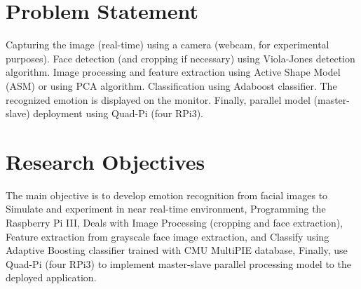 \section{Problem Statement}
Capturing the image (real-time) using a camera (webcam, for experimental purposes). Face detection (and cropping if necessary) using Viola-Jones detection algorithm. Image processing and feature extraction using Active Shape Model (ASM) or using PCA algorithm. Classification using Adaboost classifier. The recognized emotion is displayed on the monitor. Finally, parallel model (master-slave) deployment using Quad-Pi (four RPi3).

\section{Research Objectives}
The main objective is to develop emotion recognition from facial images to Simulate and experiment in near real-time environment, Programming the Raspberry Pi III, Deals with Image Processing (cropping and face extraction), Feature extraction from grayscale face image extraction, and  Classify using Adaptive Boosting classifier trained with CMU MultiPIE database, Finally, use Quad-Pi (four RPi3) to implement master-slave parallel processing model to the deployed application.